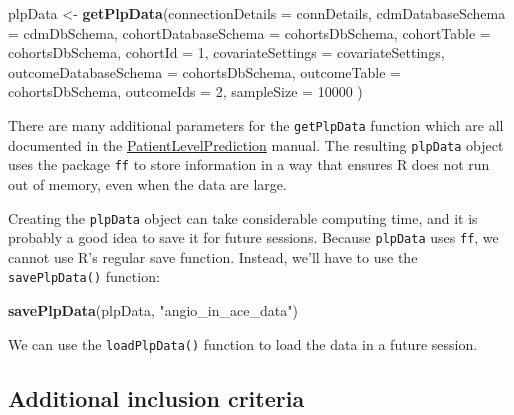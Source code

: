 \documentclass[11pt]{book}
\newenvironment{Shaded}{\begin{snugshade}}{\end{snugshade}}
\newcommand{\DataTypeTok}[1]{\textcolor[rgb]{0.13,0.29,0.53}{#1}}
\newcommand{\DecValTok}[1]{\textcolor[rgb]{0.00,0.00,0.81}{#1}}
\newcommand{\KeywordTok}[1]{\textcolor[rgb]{0.13,0.29,0.53}{\textbf{#1}}}
\newcommand{\NormalTok}[1]{#1}
\newcommand{\StringTok}[1]{\textcolor[rgb]{0.31,0.60,0.02}{#1}}
\theoremstyle{definition}
\theoremstyle{definition}
\theoremstyle{definition}
\theoremstyle{remark}
\begin{document}
\begin{Shaded}
\begin{Highlighting}[]
\NormalTok{plpData <-}\StringTok{ }\KeywordTok{getPlpData}\NormalTok{(}\DataTypeTok{connectionDetails =}\NormalTok{ connDetails,}
                      \DataTypeTok{cdmDatabaseSchema =}\NormalTok{ cdmDbSchema,}
                      \DataTypeTok{cohortDatabaseSchema =}\NormalTok{ cohortsDbSchema,}
                      \DataTypeTok{cohortTable =}\NormalTok{ cohortsDbSchema,}
                      \DataTypeTok{cohortId =} \DecValTok{1}\NormalTok{,}
                      \DataTypeTok{covariateSettings =}\NormalTok{ covariateSettings,}
                      \DataTypeTok{outcomeDatabaseSchema =}\NormalTok{ cohortsDbSchema,}
                      \DataTypeTok{outcomeTable =}\NormalTok{ cohortsDbSchema,}
                      \DataTypeTok{outcomeIds =} \DecValTok{2}\NormalTok{,}
                      \DataTypeTok{sampleSize =} \DecValTok{10000}
\NormalTok{)}
\end{Highlighting}
\end{Shaded}

There are many additional parameters for the \texttt{getPlpData} function which are all documented in the \href{https://ohdsi.github.io/PatientLevelPrediction/}{PatientLevelPrediction} manual. The resulting \texttt{plpData} object uses the package \texttt{ff} to store information in a way that ensures R does not run out of memory, even when the data are large.

Creating the \texttt{plpData} object can take considerable computing time, and it is probably a good idea to save it for future sessions. Because \texttt{plpData} uses \texttt{ff}, we cannot use R's regular save function. Instead, we'll have to use the \texttt{savePlpData()} function:

\begin{Shaded}
\begin{Highlighting}[]
\KeywordTok{savePlpData}\NormalTok{(plpData, }\StringTok{"angio_in_ace_data"}\NormalTok{)}
\end{Highlighting}
\end{Shaded}

We can use the \texttt{loadPlpData()} function to load the data in a future session.

\hypertarget{additional-inclusion-criteria}{%
\subsection{Additional inclusion criteria}\label{additional-inclusion-criteria}}
\end{document}
